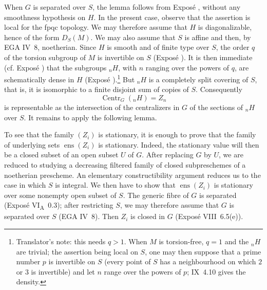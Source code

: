 When \(G\) is separated over \(S\), the lemma follows from Exposé
, without any smoothness hypothesis on \(H\). In the present
case, observe that the assertion is local for the fpqc topology. We
may therefore assume that \(H\) is diagonalizable, hence of the form
\(D_S(M)\). We may also assume that \(S\) is affine and then, by EGA
IV~8, noetherian. Since \(H\) is smooth and of finite type over \(S\),
the order \(q\) of the torsion subgroup of \(M\) is invertible on
\(S\) (Exposé ). It is then immediate (cf. Exposé )
that the subgroups \({}_nH\), with \(n\) ranging over the powers of
\(q\), are schematically dense in \(H\) (Exposé ).\footnote{Translator's
note: this needs \(q>1\). When \(M\) is torsion-free, \(q=1\) and the
\({}_nH\) are trivial; the assertion being local on \(S\), one may then
suppose that a prime number \(p\) is invertible on \(S\) (every point
of \(S\) has a neighbourhood on which \(2\) or \(3\) is invertible) and
let \(n\) range over the powers of \(p\); IX~4.10 gives the density.} But
\({}_nH\) is a completely split covering of \(S\), that is, it is
isomorphic to a finite disjoint sum of copies of \(S\). Consequently
\[
  \operatorname{Centr}_G({}_nH)=Z_n
\]
is representable as the intersection of the centralizers in \(G\) of
the sections of \({}_nH\) over \(S\). It remains to apply the following
lemma.


To see that the family \((Z_i)\) is stationary, it is enough to prove
that the family of underlying sets \(\operatorname{ens}(Z_i)\) is
stationary. Indeed, the stationary value will then be a closed subset
of an open subset \(U\) of \(G\). After replacing \(G\) by \(U\), we
are reduced to studying a decreasing filtered family of closed
subpreschemes of a noetherian prescheme. An elementary constructibility
argument reduces us to the case in which \(S\) is integral. We then
have to show that \(\operatorname{ens}(Z_i)\) is stationary over some
nonempty open subset of \(S\). The generic fibre of \(G\) is separated
(Exposé VI\textsubscript{A}~0.3); after restricting \(S\), we may
therefore assume that \(G\) is separated over \(S\) (EGA IV~8). Then
\(Z_i\) is closed in \(G\) (Exposé VIII~6.5(e)).

